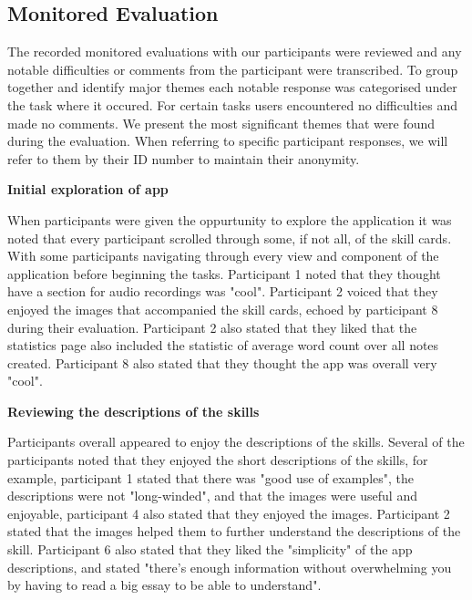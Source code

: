 \documentclass{l4proj}
\begin{document}
\subsection{Monitored Evaluation}

The recorded monitored evaluations with our participants were reviewed and any notable difficulties or 
comments from the participant were transcribed. To group together and identify major themes each notable 
response was categorised under the task where it occured. For certain tasks users encountered no difficulties 
and made no comments. We present the most significant themes that were found during the evaluation. When 
referring to specific participant responses, we will refer to them by their ID number to maintain their 
anonymity.
\par 


\textbf{Initial exploration of app}
\par 
When participants were given the oppurtunity to explore the application it was noted that every participant
scrolled through some, if not all, of the skill cards. With some participants navigating through every 
view and component of the application before beginning the tasks. Participant 1 noted that they thought
have a section for audio recordings was "cool". Participant 2 voiced that they enjoyed the images that
accompanied the skill cards, echoed by participant 8 during their evaluation. Participant 2 also stated 
that they liked that the statistics page also included the statistic of average word count over all notes created.
Participant 8 also stated that they thought the app was overall very "cool".
\par 

\textbf{Reviewing the descriptions of the skills}
\par
Participants overall appeared to enjoy the descriptions of the skills. Several of the participants noted that 
they enjoyed the short descriptions of the skills, for example, participant 1 stated that there was "good use 
of examples", the descriptions were not "long-winded", and that the images were useful and enjoyable, participant 4 
also stated that they enjoyed the images. Participant 2 stated that
the images helped them to further understand the descriptions of the skill. Participant 6 also stated that they liked
the "simplicity" of the app descriptions, and stated "there's enough information without overwhelming you by 
having to read a big essay to be able to understand".
\end{document}
